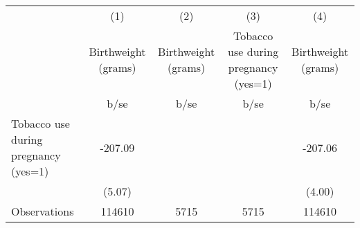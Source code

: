 {
\def\sym#1{\ifmmode^{#1}\else\(^{#1}\)\fi}
\begin{tabular}{l*{4}{c}}
\hline\hline
                                                  &\multicolumn{1}{c}{(1)}&\multicolumn{1}{c}{(2)}&\multicolumn{1}{c}{(3)}&\multicolumn{1}{c}{(4)}\\
                                                  &\multicolumn{1}{c}{Birthweight (grams)}&\multicolumn{1}{c}{Birthweight (grams)}&\multicolumn{1}{c}{Tobacco use during pregnancy (yes=1)}&\multicolumn{1}{c}{Birthweight (grams)}\\
                                                  &        b/se&        b/se&        b/se&        b/se\\
\hline
Tobacco use during pregnancy (yes=1)              &     -207.09&            &            &     -207.06\\
                                                  &      (5.07)&            &            &      (4.00)\\
\hline
Observations                                      &      114610&        5715&        5715&      114610\\
\hline\hline
\end{tabular}
}
